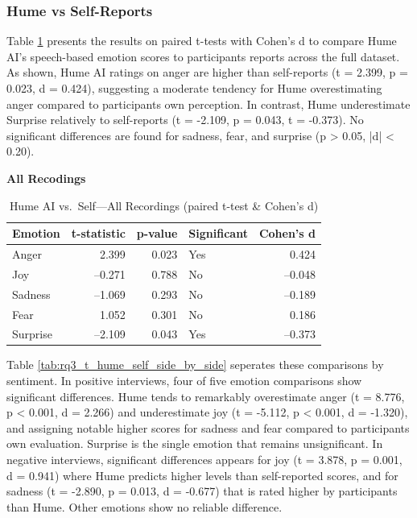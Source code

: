 \subsubsection{Hume vs Self-Reports}
Table \ref{tab:rq3_t_hume_self_all} presents the results on paired t-tests with Cohen's d to compare Hume AI's speech-based emotion scores to participants reports across the full dataset. 
As shown, Hume AI ratings on anger are higher than self-reports (t = 2.399, p = 0.023, d = 0.424), suggesting a moderate tendency for Hume overestimating anger compared to participants own perception. 
In contrast, Hume underestimate Surprise relatively to self-reports (t = -2.109, p = 0.043, t = -0.373). No significant differences are found for sadness, fear, and surprise (p > 0.05, |d| < 0.20). 
\begin{table}[H]
    \centering
    \caption*{\textbf{All Recodings}}
    \begin{tabular}{l r r l r}
      \toprule
      \textbf{Emotion} & \textbf{t-statistic} & \textbf{p-value} & \textbf{Significant} & \textbf{Cohen’s d} \\
      \midrule
      Anger    &  2.399 & 0.023 & Yes &  0.424 \\
      Joy      & –0.271 & 0.788 & No  & –0.048 \\
      Sadness  & –1.069 & 0.293 & No  & –0.189 \\
      Fear     &  1.052 & 0.301 & No  &  0.186 \\
      Surprise & –2.109 & 0.043 & Yes & –0.373 \\
      \bottomrule
    \end{tabular}
    \caption{Hume AI vs.\ Self—All Recordings (paired t-test \& Cohen’s d)}
    \label{tab:rq3_t_hume_self_all}
  \end{table}
  
Table \ref{tab:rq3_t_hume_self_side_by_side} seperates these comparisons by sentiment. In positive interviews, four of five emotion comparisons show significant differences. 
Hume tends to remarkably overestimate anger (t = 8.776, p < 0.001, d = 2.266) and underestimate joy (t = -5.112, p < 0.001, d = -1.320), 
and assigning notable higher scores for sadness and fear compared to participants own evaluation. Surprise is the single emotion that remains unsignificant.
In negative interviews, significant differences appears for joy (t = 3.878, p = 0.001, d = 0.941) where Hume predicts higher levels than self-reported scores, and for sadness (t = -2.890, p = 0.013, d = -0.677) that is rated higher by participants than Hume. 
Other emotions show no reliable difference. 


